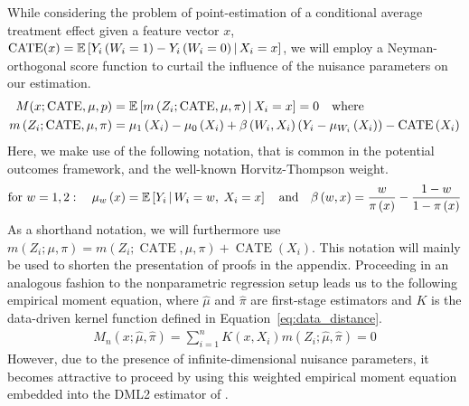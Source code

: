 While considering the problem of point-estimation of a conditional average
treatment effect given a feature vector $x$,
$\operatorname{CATE}(x) = \mathbb{E}\left[Y_{i}\left(W_{i} = 1\right) -
		Y_{i}\left(W_{i} = 0\right) \, \middle| \, X_{i} = x\right]$, we
will employ a Neyman-orthogonal score function to curtail the influence of the
nuisance parameters on our estimation.
\begin{equation}
	\begin{aligned}
		M(x; \operatorname{CATE}, \mu, p)
		 & = \mathbb{E}\left[m\left(Z_{i}; \operatorname{CATE}, \mu, \pi\right) \, \middle| \, X_{i} = x\right]
		= 0
		\quad \text{where} \quad                                                                                                                                                                                       \\
		m\left(Z_{i}; \operatorname{CATE}, \mu, \pi\right)
		 & = \mu_1\left(X_{i}\right) - \mu_0\left(X_{i}\right) + \beta\left(W_{i}, X_{i}\right)\left(Y_{i} - \mu_{W_{i}}\left(X_{i}\right)\right) - \operatorname{CATE}\left(X_{i}\right)
	\end{aligned}
\end{equation}
Here, we make use of the following notation, that is common in the potential
outcomes framework, and the well-known Horvitz-Thompson weight.
\begin{equation}
	\text{for }  w = 1,2: \quad \mu_w\left(x\right) = \mathbb{E}\left[Y_{i} \, \middle| \, W_{i} = w, \; X_{i} = x\right]
	\quad \text{and} \quad
	\beta\left(w, x\right) = \frac{w}{\pi\left(x\right)} - \frac{1 - w}{1 - \pi\left(x\right)}
\end{equation}
As a shorthand notation, we will furthermore use $m\left(Z_{i}; \mu, \pi\right) = m\left(Z_{i}; \operatorname{CATE}, \mu, \pi\right) + \operatorname{CATE}\left(X_{i}\right)$.
This notation will mainly be used to shorten the presentation of proofs in the appendix.
Proceeding in an analogous fashion to the nonparametric regression setup leads us to the following empirical moment equation, where $\hat{\mu}$ and $\hat{\pi}$ are first-stage estimators and $K$ is the data-driven kernel function defined in Equation~\ref{eq:data_distance}.
\begin{equation}
	\begin{aligned}
		M_{n}\left(x; \hat{\mu}, \hat{\pi}\right)
		= \sum_{i = 1}^{n} K(x, X_{i}) m\left(Z_{i}; \hat{\mu}, \hat{\pi}\right)
		= 0
	\end{aligned}
\end{equation}
However, due to the presence of infinite-dimensional nuisance parameters, it becomes attractive to proceed by using this weighted empirical moment equation embedded into the DML2 estimator of \citet{chernozhukov_doubledebiased_2018}.
